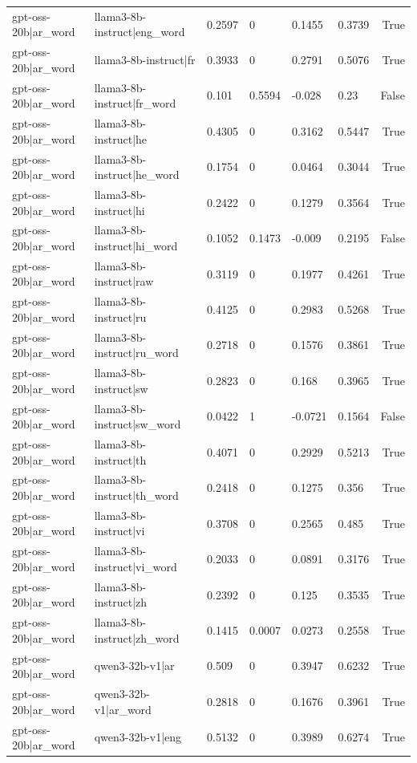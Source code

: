 \begin{table}
\begin{tabular}{llllllr}
gpt-oss-20b|ar_word & llama3-8b-instruct|eng_word & 0.2597 & 0 & 0.1455 & 0.3739 & True \\
gpt-oss-20b|ar_word & llama3-8b-instruct|fr & 0.3933 & 0 & 0.2791 & 0.5076 & True \\
gpt-oss-20b|ar_word & llama3-8b-instruct|fr_word & 0.101 & 0.5594 & -0.028 & 0.23 & False \\
gpt-oss-20b|ar_word & llama3-8b-instruct|he & 0.4305 & 0 & 0.3162 & 0.5447 & True \\
gpt-oss-20b|ar_word & llama3-8b-instruct|he_word & 0.1754 & 0 & 0.0464 & 0.3044 & True \\
gpt-oss-20b|ar_word & llama3-8b-instruct|hi & 0.2422 & 0 & 0.1279 & 0.3564 & True \\
gpt-oss-20b|ar_word & llama3-8b-instruct|hi_word & 0.1052 & 0.1473 & -0.009 & 0.2195 & False \\
gpt-oss-20b|ar_word & llama3-8b-instruct|raw & 0.3119 & 0 & 0.1977 & 0.4261 & True \\
gpt-oss-20b|ar_word & llama3-8b-instruct|ru & 0.4125 & 0 & 0.2983 & 0.5268 & True \\
gpt-oss-20b|ar_word & llama3-8b-instruct|ru_word & 0.2718 & 0 & 0.1576 & 0.3861 & True \\
gpt-oss-20b|ar_word & llama3-8b-instruct|sw & 0.2823 & 0 & 0.168 & 0.3965 & True \\
gpt-oss-20b|ar_word & llama3-8b-instruct|sw_word & 0.0422 & 1 & -0.0721 & 0.1564 & False \\
gpt-oss-20b|ar_word & llama3-8b-instruct|th & 0.4071 & 0 & 0.2929 & 0.5213 & True \\
gpt-oss-20b|ar_word & llama3-8b-instruct|th_word & 0.2418 & 0 & 0.1275 & 0.356 & True \\
gpt-oss-20b|ar_word & llama3-8b-instruct|vi & 0.3708 & 0 & 0.2565 & 0.485 & True \\
gpt-oss-20b|ar_word & llama3-8b-instruct|vi_word & 0.2033 & 0 & 0.0891 & 0.3176 & True \\
gpt-oss-20b|ar_word & llama3-8b-instruct|zh & 0.2392 & 0 & 0.125 & 0.3535 & True \\
gpt-oss-20b|ar_word & llama3-8b-instruct|zh_word & 0.1415 & 0.0007 & 0.0273 & 0.2558 & True \\
gpt-oss-20b|ar_word & qwen3-32b-v1|ar & 0.509 & 0 & 0.3947 & 0.6232 & True \\
gpt-oss-20b|ar_word & qwen3-32b-v1|ar_word & 0.2818 & 0 & 0.1676 & 0.3961 & True \\
gpt-oss-20b|ar_word & qwen3-32b-v1|eng & 0.5132 & 0 & 0.3989 & 0.6274 & True \\

\end{tabular}
\end{table}
